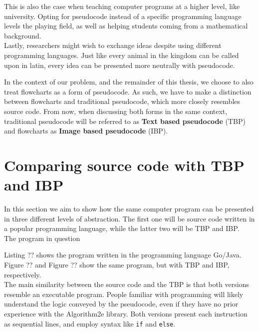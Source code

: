 This is also the case when teaching computer programs at a higher level, like university. Opting for pseudocode instead of a specific programming language levels the playing field, as well as helping students coming from a mathematical background. \hfill \\

Lastly, researchers might wish to exchange ideas despite using different programming languages. Just like every animal in the kingdom can be called upon in latin, every idea can be presented more neutrally with pseudocode. \hfill \\


In the context of our problem, and the remainder of this thesis, we choose to also treat flowcharts as a form of pseudocode. As such, we have to make a distinction between flowcharts and traditional pseudocode, which more closely resembles source code. From now, when discussing both forms in the same context, traditional pseudocode will be referred to as \textbf{Text based pseudocode} (TBP) and flowcharts as \textbf{Image based pseudocode} (IBP).

\section{Comparing source code with TBP and IBP}

In this section we aim to show how the same computer program can be presented in three different levels of abstraction. The first one will be source code written in a popular programming language, while the latter two will be TBP and IBP. \\

The program in question 

Listing ?? shows the program written in the programming language Go/Java. Figure ?? and Figure ?? show the same program, but with TBP and IBP, respectively. \hfill \\

The main similarity between the source code and the TBP is that both versions resemble an executable program. People familiar with programming will likely understand the logic conveyed by the pseudocode, even if they have no prior experience with the Algorithm2e library. Both versions present each instruction as sequential lines, and employ syntax like \texttt{if} and \texttt{else}. 

